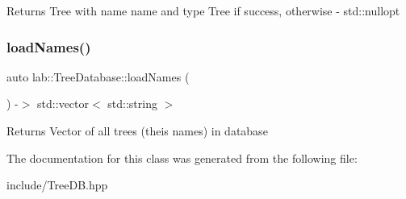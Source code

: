 \begin{DoxyReturn}{Returns}
Tree with name name and type Tree if success, otherwise -\/ std\+::nullopt 
\end{DoxyReturn}
\mbox{\label{classlab_1_1TreeDatabase_ad465665c67abac43de6eac1820e1320f}} 
\subsubsection{\texorpdfstring{load\+Names()}{loadNames()}}
{\footnotesize\ttfamily auto lab\+::\+Tree\+Database\+::load\+Names (\begin{DoxyParamCaption}{ }\end{DoxyParamCaption}) -\/$>$  std\+::vector$<$ std\+::string $>$}

\begin{DoxyReturn}{Returns}
Vector of all trees (theis names) in database 
\end{DoxyReturn}


The documentation for this class was generated from the following file\+:\begin{DoxyCompactItemize}
\item 
include/Tree\+D\+B.\+hpp\end{DoxyCompactItemize}
